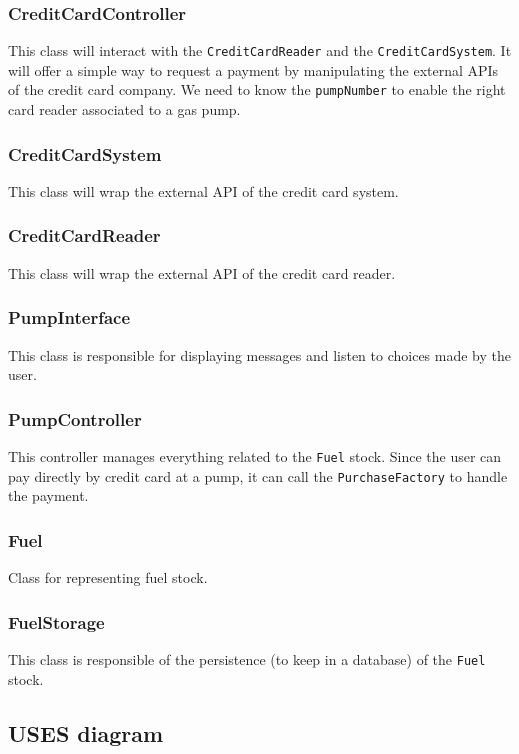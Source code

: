 \documentclass[11pt, a4paper]{article}
\begin{document}
\subsubsection*{CreditCardController}
This class will interact with the \lstinline|CreditCardReader| and the \lstinline|CreditCardSystem|.
It will offer a simple way to request a payment by manipulating the external APIs of the credit card company.
We need to know the \lstinline|pumpNumber| to enable the right card reader associated to a gas pump.

\subsubsection*{CreditCardSystem}
This class will wrap the external API of the credit card system.

\subsubsection*{CreditCardReader}
This class will wrap the external API of the credit card reader.

\subsubsection*{PumpInterface}
This class is responsible for displaying messages and listen to choices made by the user.

\subsubsection*{PumpController}
This controller manages everything related to the \lstinline|Fuel| stock. Since the user can pay directly by credit card at a pump, it can call the \lstinline|PurchaseFactory| to handle the payment.

\subsubsection*{Fuel}
Class for representing fuel stock.

\subsubsection*{FuelStorage}
This class is responsible of the persistence (to keep in a database) of the \lstinline|Fuel| stock.


\subsection*{USES diagram}
\end{document}

